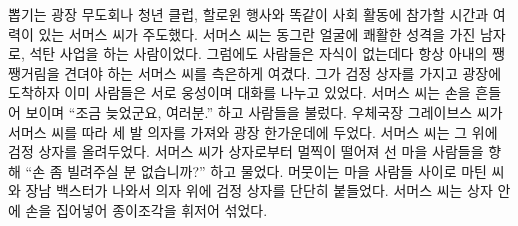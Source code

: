 \documentclass{translation}
\begin{document}
뽑기는 광장 무도회나 청년 클럽, 할로윈 행사와 똑같이 사회 활동에 참가할 시간과 여력이 있는 서머스 씨가 주도했다.
서머스 씨는 동그란 얼굴에 쾌활한 성격을 가진 남자로, 석탄 사업을 하는 사람이었다.
그럼에도 사람들은 자식이 없는데다 항상 아내의 쨍쨍거림을 견뎌야 하는 서머스 씨를 측은하게 여겼다.
그가 검정 상자를 가지고 광장에 도착하자 이미 사람들은 서로 웅성이며 대화를 나누고 있었다.
서머스 씨는 손을 흔들어 보이며 ``조금 늦었군요, 여러분.'' 하고 사람들을 불렀다.
우체국장 그레이브스 씨가 서머스 씨를 따라 세 발 의자를 가져와 광장 한가운데에 두었다.
서머스 씨는 그 위에 검정 상자를 올려두었다.
서머스 씨가 상자로부터 멀찍이 떨어져 선 마을 사람들을 향해 ``손 좀 빌려주실 분 없습니까?'' 하고 물었다.
머뭇이는 마을 사람들 사이로 마틴 씨와 장남 백스터가 나와서 의자 위에 검정 상자를 단단히 붙들었다.
서머스 씨는 상자 안에 손을 집어넣어 종이조각을 휘저어 섞었다.
% 
\end{document}
